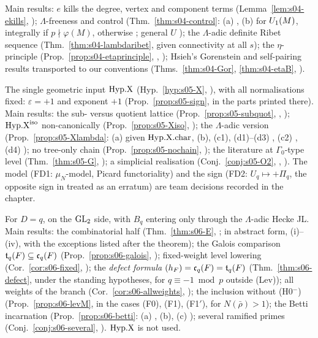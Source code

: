\begin{description}[leftmargin=0pt,itemsep=4pt]
\item[Stage 04: the ordinary and $\Lambda$-adic passage.] Main results: $e$ kills the degree, vertex and component terms
  (Lemma~\ref{lem:s04-ekills}, \stproved); $\Lambda$-freeness and control (Thm.~\ref{thm:s04-control}: (a) \stproved, (b) \stcited{} for
  $U_1(M)$, integrally if $p\nmid\varphi(M)$, otherwise \stsketch; general $U$ \stexp); the $\Lambda$-adic definite Ribet sequence
  (Thm.~\ref{thm:s04-lambdaribet}, \stproved{} given connectivity at all $s$); the $\eta$-principle
  (Prop.~\ref{prop:s04-etaprinciple}, \stproved, \stformal); Hsieh's Gorenstein and self-pairing results transported to our
  conventions (Thms.~\ref{thm:s04-Gor}, \ref{thm:s04-etaB}, \stcited).
\item[Stage 05: the comparison hypothesis and the simplicial shape.] The single geometric input $\mathrm{Hyp.X}$ (Hyp.~\ref{hyp:s05-X},
  \sthyp), with all normalisations fixed: $\varepsilon=+1$ and exponent $+1$ (Prop.~\ref{prop:s05-sign}, \stpmc{} in the parts printed
  there). Main results: the sub- versus quotient lattice (Prop.~\ref{prop:s05-subquot}, \stproved, \stformal); $\mathrm{Hyp.X}^{\mathrm{iso}}$
  non-canonically (Prop.~\ref{prop:s05-Xiso}, \stpmc); the $\Lambda$-adic version (Prop.~\ref{prop:s05-Xlambda}: (a) \stproved{} given
  $\mathrm{Hyp.X.char}$, (b), (c1), (d1)--(d3) \stpmc, (c2) \stopen, (d4) \stsketch); no tree-only chain (Prop.~\ref{prop:s05-nochain},
  \stproved); the literature at $\Gamma_0$-type level (Thm.~\ref{thm:s05-G}, \stcited); a simplicial realisation
  (Conj.~\ref{conj:s05-O2}, \stconj, \stopen). The model (FD1: $\mu_N$-model, Picard functoriality) and the sign (FD2: $U_q\mapsto+\Pi_q$,
  the opposite sign in \cite{Hs} treated as an erratum) are team decisions recorded in the chapter.
\item[Stage 06: the integral Jacquet--Langlands defect.] For $D=q$, on the $\mathrm{GL}_2$ side, with $B_q$ entering only through the
  $\Lambda$-adic Hecke JL. Main results: the combinatorial half (Thm.~\ref{thm:s06-E}, \stproved; \stformalized{} in abstract form, (i)--(iv), with the exceptions listed after the theorem); the Galois
  comparison $\mathfrak{t}_q(F)\subseteq\mathfrak{c}_q(F)$ (Prop.~\ref{prop:s06-galois}, \stpmc); fixed-weight level lowering
  (Cor.~\ref{cor:s06-fixed}, \stpmc); the \emph{defect formula} $(h_F)=\mathfrak{c}_q(F)=\mathfrak{t}_q(F)$ (Thm.~\ref{thm:s06-defect}, \stpmc{} under
  the standing hypotheses, \stopen{} for $q\equiv-1\bmod p$ outside (Lev)); all weights of the branch
  (Cor.~\ref{cor:s06-allweights}, \stpmc); the inclusion without (H0$^-$) (Prop.~\ref{prop:s06-levM}, \stpmc{} in the cases (F0),
  (F1), (F1$'$), \stopen{} for $N(\bar\rho)>1$); the Betti incarnation (Prop.~\ref{prop:s06-betti}: (a) \stproved, (b), (c) \stpmc); several ramified primes
  (Conj.~\ref{conj:s06-several}, \stconj). $\mathrm{Hyp.X}$ is not used.
\end{description}

